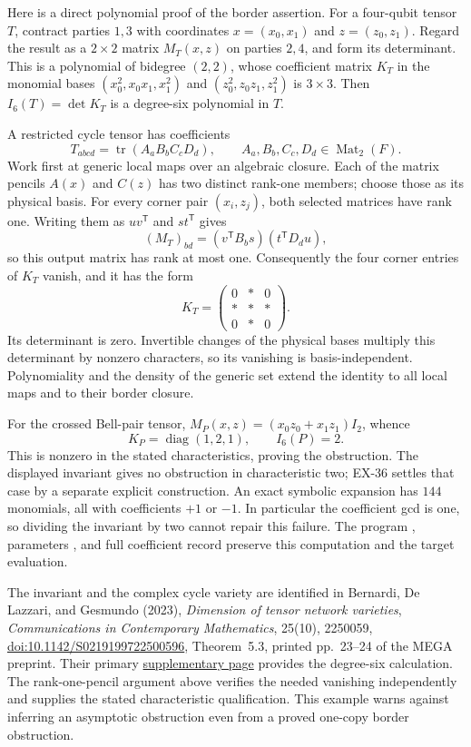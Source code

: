 Here is a direct polynomial proof of the border assertion.
For a four-qubit tensor $T$, contract parties $1,3$ with
coordinates $x=(x_0,x_1)$ and $z=(z_0,z_1)$. Regard the
result as a $2\times2$ matrix $M_T(x,z)$ on parties $2,4$,
and form its determinant. This is a polynomial of bidegree
$(2,2)$, whose coefficient matrix $K_T$ in the monomial
bases $(x_0^2,x_0x_1,x_1^2)$ and
$(z_0^2,z_0z_1,z_1^2)$ is $3\times3$.
Then $I_6(T)=\det K_T$ is a degree-six polynomial in $T$.

A restricted cycle tensor has coefficients
\[
 T_{abcd}=\operatorname{tr}(A_aB_bC_cD_d),
 \qquad A_a,B_b,C_c,D_d\in\operatorname{Mat}_2(F).
\]
Work first at generic local maps over an algebraic closure.
Each of the matrix pencils $A(x)$ and $C(z)$ has two
distinct rank-one members; choose those as its physical
basis. For every corner pair $(x_i,z_j)$, both selected
matrices have rank one. Writing them as $uv^{\mathsf T}$
and $st^{\mathsf T}$ gives
\[
 (M_T)_{bd}
   =(v^{\mathsf T}B_b s)(t^{\mathsf T}D_d u),
\]
so this output matrix has rank at most one. Consequently
the four corner entries of $K_T$ vanish, and it has the form
\[
 K_T=\begin{pmatrix}0&*&0\\ *&*&*\\0&*&0\end{pmatrix}.
\]
Its determinant is zero. Invertible changes of the physical
bases multiply this determinant by nonzero characters, so
its vanishing is basis-independent. Polynomiality and the
density of the generic set extend the identity to all local
maps and to their border closure.

For the crossed Bell-pair tensor,
$M_P(x,z)=(x_0z_0+x_1z_1)I_2$, whence
\[
 K_P=\operatorname{diag}(1,2,1),\qquad I_6(P)=2.
\]
This is nonzero in the stated characteristics, proving the
obstruction. The displayed invariant gives no obstruction
in characteristic two; EX-36 settles that case by a separate
explicit construction.
An exact symbolic expansion has $144$ monomials, all with
coefficients $+1$ or $-1$. In particular the coefficient
gcd is one, so dividing the invariant by two cannot repair
this failure. The program
, parameters
, and full
coefficient record 
preserve this computation and the target evaluation.

The invariant and the complex cycle variety are identified
in Bernardi, De Lazzari, and Gesmundo (2023),
\emph{Dimension of tensor network varieties},
\emph{Communications in Contemporary Mathematics},
25(10), 2250059,
\href{https://doi.org/10.1142/S0219199722500596}
{doi:10.1142/S0219199722500596}, Theorem~5.3,
printed pp.~23--24 of the MEGA preprint. Their primary
\href{https://fulges.github.io/code/BDG-DimensionTNS.html}
{supplementary page} provides the degree-six calculation.
The rank-one-pencil argument above verifies the needed
vanishing independently and supplies the stated
characteristic qualification. This example warns against
inferring an asymptotic obstruction even from a proved
one-copy border obstruction.

